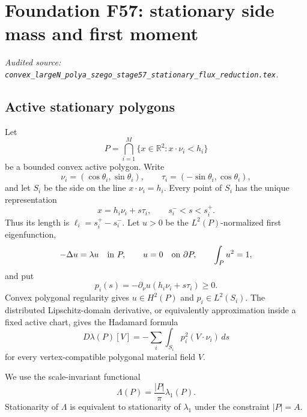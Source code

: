 \begingroup
\section{Foundation F57: stationary side mass and first moment}
\label{module:F57}
\noindent\textit{Audited source: \nolinkurl{convex_largeN_polya_szego_stage57_stationary_flux_reduction.tex}.}
\subsection{Active stationary polygons}

Let
\begin{equation}
 P=\bigcap_{i=1}^M\{x\in\mathbb R^2:x\cdot\nu_i<h_i\}
\end{equation}
be a bounded convex active polygon.  Write
\begin{equation}
 \nu_i=(\cos\theta_i,\sin\theta_i),\qquad
 \tau_i=(-\sin\theta_i,\cos\theta_i),
\end{equation}
and let $S_i$ be the side on the line $x\cdot\nu_i=h_i$.
Every point of $S_i$ has the unique representation
\begin{equation}\label{F57:eq:side-coordinate}
 x=h_i\nu_i+s\tau_i,\qquad s_i^-<s<s_i^+.
\end{equation}
Thus its length is
$\ell_i=s_i^+-s_i^-$.  Let $u>0$ be the $L^2(P)$-normalized first
eigenfunction,
\begin{equation}\label{F57:eq:eigen}
 -\Delta u=\lambda u\quad\hbox{in }P,\qquad
 u=0\quad\hbox{on }\partial P,\qquad
 \int_Pu^2=1,
\end{equation}
and put
\begin{equation}
 p_i(s)=-\partial_\nu u(h_i\nu_i+s\tau_i)\ge0.
\end{equation}
Convex polygonal regularity gives $u\in H^2(P)$ and
$p_i\in L^2(S_i)$.  The distributed Lipschitz-domain derivative, or
equivalently approximation inside a fixed active chart, gives the Hadamard
formula
\begin{equation}\label{F57:eq:Hadamard}
 D\lambda(P)[V]=-
 \sum_i\int_{S_i}p_i^2(V\cdot\nu_i)\,ds
\end{equation}
for every vertex-compatible polygonal material field $V$.

We use the scale-invariant functional
\begin{equation}
 \Lambda(P)=\frac{|P|}{\pi}\lambda_1(P).
\end{equation}
Stationarity of $\Lambda$ is equivalent to stationarity of $\lambda_1$
under the constraint $|P|=A$.

